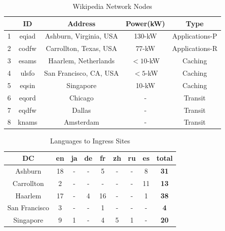 \documentclass[conference]{IEEEtran}
\begin{document}
\begin{table}[htbp]
\caption{Wikipedia Network Nodes}
\begin{center}
	\begin{tabular}{|c|c|c|c|c|}
		\hline
	{} &         ID &  Address                  & Power(kW) & Type \\
		\hline
	1 &       eqiad &  Ashburn, Virginia, USA   & 130-kW    & Applications-P \\
	2 &       codfw &  Carrollton, Texas, USA   & 77-kW     & Applications-R  \\
	3 &       esams &  Haarlem, Netherlands     & $<10$-kW  & Caching  \\
	4 &       ulsfo &  San Francisco, CA, USA   & $<5$-kW   & Caching  \\
	5 &       eqsin &  Singapore                & 10-kW     & Caching \\
	6 &       eqord &  Chicago                  & -         & Transit \\
	7 &       eqdfw &  Dallas                   & -         & Transit \\
	8 &       knams &  Amsterdam                & -         & Transit \\
		\hline
\end{tabular}
\label{wiki_dc}

\end{center}
\end{table} 

\begin{table}[htbp]
\caption{Languages to Ingress Sites}
\begin{center}
\begin{tabular}{|c|c|c|c|c|c|c|c|c|}
\hline
DC            &  en & ja & de &  fr & zh & ru &  es & \textbf{total} \\
\hline
Ashburn       &  18 &  - &  - &   5 &  - &  - &   8 & \textbf{31} \\
Carrollton    &   2 &  - &  - &   - &  - &  - &  11 & \textbf{13} \\
Haarlem       &  17 &  - &  4 &  16 &  - &  - &   1 & \textbf{38} \\
San Francisco &   3 &  - &  - &   1 &  - &  - &   - & \textbf{4}  \\
Singapore     &   9 &  1 &  - &   4 &  5 &  1 &   - & \textbf{20} \\
\hline
\end{tabular}
\label{ingress_lang}
\end{center}
\end{table}
\end{document}
